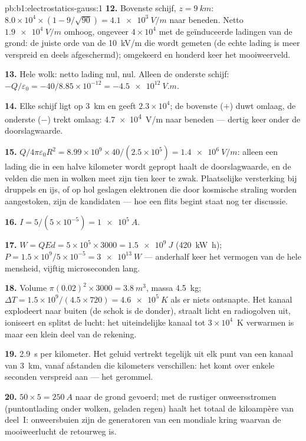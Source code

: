 \begin{solution}{pb:b1:electrostatics-gauss:1}
\textbf{12.} Bovenste schijf, $z = \qty{9}{km}$: $8.0 \times 10^4 \times (1 - 9/\sqrt{90}) =
\qty{4.1e3}{V/m}$ naar beneden. Netto $\qty{1.9e4}{V/m}$ omhoog, ongeveer $4 \times 10^4$
met de geïnduceerde ladingen van de grond: de juiste orde van de \qty{10}{kV/m}
die wordt gemeten (de echte lading is meer verspreid en deels afgeschermd);
omgekeerd en honderd keer het mooiweerveld.

\textbf{13.} Hele wolk: netto lading nul,  nul. Alleen de onderste schijf:
$-Q/\varepsilon_0 = -40/8.85 \times 10^{-12} = \qty{-4.5e12}{V.m}$.

\textbf{14.} Elke schijf ligt op \qty{3}{km} en geeft $2.3 \times 10^4$; de
bovenste ($+$) duwt omlaag, de onderste ($-$) trekt omlaag: \qty{4.7e4}{V/m}
naar beneden --- dertig keer onder de doorslagwaarde.

\textbf{15.} $Q/4\pi\varepsilon_0R^2 = 8.99 \times 10^9 \times 40/(2.5 \times 10^5) =
\qty{1.4e6}{V/m}$: alleen een lading die in een halve kilometer wordt gepropt haalt
de doorslagwaarde, en de velden die men in wolken meet zijn tien keer te zwak. Plaatselijke
versterking bij druppels en ijs, of op hol geslagen elektronen die door kosmische
straling worden aangestoken, zijn de kandidaten --- hoe een flits begint staat nog ter discussie.

\textbf{16.} $I = 5/(5 \times 10^{-5}) = \qty{1e5}{A}$.

\textbf{17.} $W = QEd = 5 \times 10^5 \times 3000 = \qty{1.5e9}{J}$ (\qty{420}{kW h});
$P = 1.5 \times 10^9/5 \times 10^{-5} = \qty{3e13}{W}$ --- anderhalf keer
het vermogen van de hele mensheid, vijftig microseconden lang.

\textbf{18.} Volume $\pi(0.02)^2 \times 3000 = \qty{3.8}{m^3}$, massa \qty{4.5}{kg};
$\Delta T = 1.5 \times 10^9/(4.5 \times 720) = \qty{4.6e5}{K}$ als er niets ontsnapte.
Het kanaal explodeert naar buiten (de schok is de donder), straalt licht
en radiogolven uit, ioniseert en splitst de lucht: het uiteindelijke kanaal
tot $3 \times 10^4$~K verwarmen is maar een klein deel van de rekening.

\textbf{19.} \qty{2.9}{s} per kilometer. Het geluid vertrekt tegelijk uit elk punt van een
kanaal van \qty{3}{km}, vanaf afstanden die kilometers verschillen: het
komt over enkele seconden verspreid aan --- het gerommel.

\textbf{20.} $50 \times 5 = \qty{250}{A}$ naar de grond gevoerd; met de
rustiger onweersstromen (puntontlading onder wolken, geladen regen) haalt het
totaal de kiloampère van deel~I: onweersbuien zijn de generatoren van een
mondiale kring waarvan de mooiweerlucht de retourweg is.


\end{solution}
